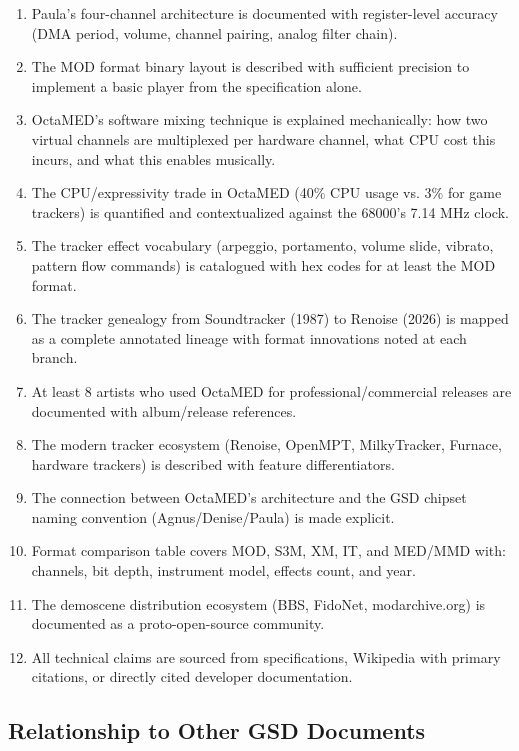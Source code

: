 \documentclass[11pt,letterpaper]{article}
\begin{document}
\begin{enumerate}[leftmargin=1.5em]
  \item Paula's four-channel architecture is documented with register-level accuracy (DMA period, volume, channel pairing, analog filter chain).
  \item The MOD format binary layout is described with sufficient precision to implement a basic player from the specification alone.
  \item OctaMED's software mixing technique is explained mechanically: how two virtual channels are multiplexed per hardware channel, what CPU cost this incurs, and what this enables musically.
  \item The CPU/expressivity trade in OctaMED (40\% CPU usage vs. 3\% for game trackers) is quantified and contextualized against the 68000's 7.14 MHz clock.
  \item The tracker effect vocabulary (arpeggio, portamento, volume slide, vibrato, pattern flow commands) is catalogued with hex codes for at least the MOD format.
  \item The tracker genealogy from Soundtracker (1987) to Renoise (2026) is mapped as a complete annotated lineage with format innovations noted at each branch.
  \item At least 8 artists who used OctaMED for professional/commercial releases are documented with album/release references.
  \item The modern tracker ecosystem (Renoise, OpenMPT, MilkyTracker, Furnace, hardware trackers) is described with feature differentiators.
  \item The connection between OctaMED's architecture and the GSD chipset naming convention (Agnus/Denise/Paula) is made explicit.
  \item Format comparison table covers MOD, S3M, XM, IT, and MED/MMD with: channels, bit depth, instrument model, effects count, and year.
  \item The demoscene distribution ecosystem (BBS, FidoNet, modarchive.org) is documented as a proto-open-source community.
  \item All technical claims are sourced from specifications, Wikipedia with primary citations, or directly cited developer documentation.
\end{enumerate}

\subsection{Relationship to Other GSD Documents}
\end{document}
